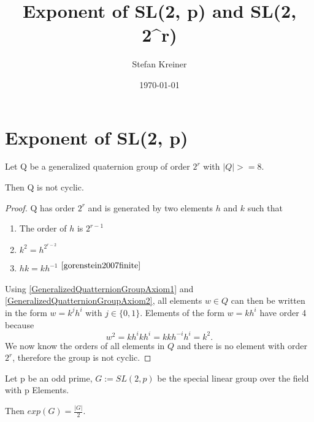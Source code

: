 \documentclass[a4paper,10pt]{article}
\title{Exponent of SL(2, p) and SL(2, 2^r)}
\author{Stefan Kreiner}
\date{\today}
\begin{document}
\tableofcontents

\section{Exponent of SL(2, p)}

\begin{lemma} \label{GeneralizedQuaternionGroupNonCyclicForNontrivialCase}
	Let Q be a generalized quaternion group of order $2^r$ with $|Q| >= 8$.

	Then Q is not cyclic.
\end{lemma}

\begin{proof}
	Q has order $2^r$ and is generated by two elements $h$ and $k$ such that
	\begin{enumerate}
		\item The order of $h$ is $2^{r-1}$ \label{GeneralizedQuatternionGroupAxiom1}
		\item $k^2 = h^{2^{r-2}}$ \label{GeneralizedQuatternionGroupAxiom2}
		\item $hk = kh^{-1}$ $^{\cite[p. 29]{gorenstein2007finite}}$ \label{GeneralizedQuatternionGroupAxiom3}
	\end{enumerate}
	Using \ref{GeneralizedQuatternionGroupAxiom1} and \ref{GeneralizedQuatternionGroupAxiom2}, all elements $w \in Q$ can then be written in the form $w = k^jh^i$ with $j \in \{0,1\}$. Elements of the form $w = kh^i$ have order 4 because
	\begin{equation*}
		w^2 = kh^ikh^i = kkh^{-i}h^i = k^2.
	\end{equation*}
	We now know the orders of all elements in $Q$ and there is no element with order $2^r$, therefore the group is not cyclic.
\end{proof}

\begin{theorem} \label{ExponentOfSL2p}
	Let p be an odd prime, $G := SL(2, p)$ be the special linear group over the field with p Elements.

	Then $exp(G) = \frac{|G|}{2}$.
\end{theorem}
\end{document}
